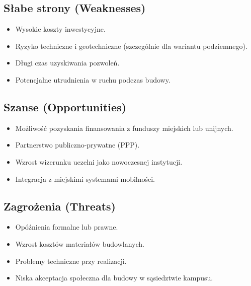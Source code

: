 \documentclass[a4paper,12pt]{article}
\begin{document}
\subsection*{Słabe strony (Weaknesses)}
\begin{itemize}
    \item Wysokie koszty inwestycyjne.
    \item Ryzyko techniczne i geotechniczne (szczególnie dla wariantu podziemnego).
    \item Długi czas uzyskiwania pozwoleń.
    \item Potencjalne utrudnienia w ruchu podczas budowy.
\end{itemize}

\subsection*{Szanse (Opportunities)}
\begin{itemize}
    \item Możliwość pozyskania finansowania z funduszy miejskich lub unijnych.
    \item Partnerstwo publiczno-prywatne (PPP).
    \item Wzrost wizerunku uczelni jako nowoczesnej instytucji.
    \item Integracja z miejskimi systemami mobilności.
\end{itemize}

\subsection*{Zagrożenia (Threats)}
\begin{itemize}
    \item Opóźnienia formalne lub prawne.
    \item Wzrost kosztów materiałów budowlanych.
    \item Problemy techniczne przy realizacji.
    \item Niska akceptacja społeczna dla budowy w sąsiedztwie kampusu.
\end{itemize}
\end{document}
